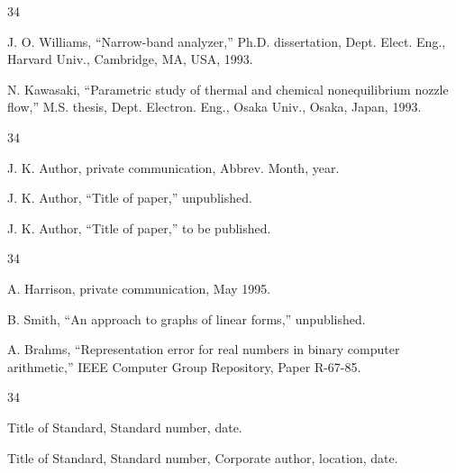 \documentclass{IEEEojcsys}
\begin{document}
\vspace*{-12pt}

\begin{thebibliography}{34}
\setcounter{enumiv}{24}

\bibitem{}J. O. Williams, ``Narrow-band analyzer,'' Ph.D. dissertation, Dept. Elect. Eng., Harvard Univ., Cambridge, MA, USA, 1993.

\bibitem{}N. Kawasaki, ``Parametric study of thermal and chemical nonequilibrium nozzle flow,'' M.S. thesis, Dept. Electron. Eng., Osaka Univ., Osaka, Japan, 1993.
\end{thebibliography}

\vspace*{-12pt}
\begin{thebibliography}{34}\itemindent-6.5pt
\item[a)] J. K. Author, private communication, Abbrev. Month, year.

\item[b)] J. K. Author, ``Title of paper,'' unpublished.

\item[c)] J. K. Author, ``Title of paper,'' to be published.
\end{thebibliography}\vspace*{-14pt}

\vspace*{-12pt}

\begin{thebibliography}{34}
\setcounter{enumiv}{26}

\bibitem{}A. Harrison, private communication, May 1995.

\bibitem{}B. Smith, ``An approach to graphs of linear forms,'' unpublished.

\bibitem{}A. Brahms, ``Representation error for real numbers in binary computer arithmetic,'' IEEE Computer Group Repository, Paper R-67-85.
\end{thebibliography}

\vspace*{-12pt}
\begin{thebibliography}{34}\itemindent-6.5pt
\item[a)] {Title of Standard}, Standard number, date.

\item[b)] {Title of Standard}, Standard number, Corporate author, location, date.
\end{thebibliography}\vspace*{-14pt}
\end{document}
